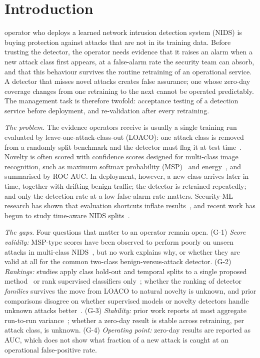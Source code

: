 \documentclass[conference]{IEEEtran}
\begin{document}
\section{Introduction}
 operator who deploys a learned network intrusion detection system (NIDS) is buying protection against attacks that are not in its training data. Before trusting the detector, the operator needs evidence that it raises an alarm when a new attack class first appears, at a false-alarm rate the security team can absorb, and that this behaviour survives the routine retraining of an operational service. A detector that misses novel attacks creates false assurance; one whose zero-day coverage changes from one retraining to the next cannot be operated predictably. The management task is therefore twofold: acceptance testing of a detection service before deployment, and re-validation after every retraining.

\emph{The problem.} The evidence operators receive is usually a single training run evaluated by leave-one-attack-class-out (LOACO): one attack class is removed from a randomly split benchmark and the detector must flag it at test time~\cite{wilkie2026,jodayree2026,sarhan2023zeroday}. Novelty is often scored with confidence scores designed for multi-class image recognition, such as maximum softmax probability (MSP)~\cite{hendrycks2017} and energy~\cite{liu2020energy}, and summarised by ROC AUC. In deployment, however, a new class arrives later in time, together with drifting benign traffic; the detector is retrained repeatedly; and only the detection rate at a low false-alarm rate matters. Security-ML research has shown that evaluation shortcuts inflate results~\cite{sommer2010,arp2022,pendlebury2019,apruzzese2023}, and recent work has begun to study time-aware NIDS splits~\cite{andresini2021,abdessamad2026,moczkodan2026}.

\emph{The gaps.} Four questions that matter to an operator remain open. (G-1) \emph{Score validity:} MSP-type scores have been observed to perform poorly on unseen attacks in multi-class NIDS~\cite{zhang2021ijmlc,talpini2024}, but no work explains why, or whether they are valid at all for the common two-class benign-versus-attack detector. (G-2) \emph{Rankings:} studies apply class hold-out and temporal splits to a single proposed method~\cite{nayak2026,alhalangy2026} or rank supervised classifiers only~\cite{abdessamad2026}; whether the ranking of detector \emph{families} survives the move from LOACO to natural novelty is unknown, and prior comparisons disagree on whether supervised models or novelty detectors handle unknown attacks better~\cite{zoppi2023,mesca2026}. (G-3) \emph{Stability:} prior work reports at most aggregate run-to-run variance~\cite{talpini2024}; whether a zero-day result is stable across retraining, per attack class, is unknown. (G-4) \emph{Operating point:} zero-day results are reported as AUC, which does not show what fraction of a new attack is caught at an operational false-positive rate.
\end{document}
